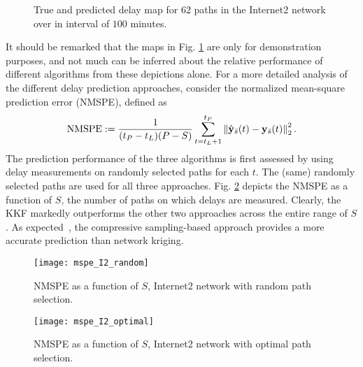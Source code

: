 \documentclass[draftcls,onecolumn,12pt]{IEEEtran}
\newlength \figwidth
\def \ybt {{\b{y}_{\bar{s}}(t)}}
\def \yh {{\hat{\b{y}}_{\bar{s}}}}
\theoremstyle{plain}\newtheorem{thm}{Theorem}
\theoremstyle{definition}
\theoremstyle{remark}
\begin{document}
\begin{figure}
	\centering
     
  \caption{True and predicted delay map for $62$ paths in the Internet2 network over in interval of $100$ minutes.}
  \label{delaymaps}
\end{figure}


{It should be remarked that the maps in Fig. \ref{delaymaps} are only for demonstration purposes, and not much can be inferred about the relative performance of different algorithms from these depictions alone.} For a more detailed analysis of the different delay prediction approaches, consider the normalized mean-square prediction error (NMSPE), defined as
\begin{align}
\text{NMSPE} := \frac{1}{(t_P-t_L)(P-S)}\sum_{t=t_L+1}^{t_P}\left\|\yh(t)-\ybt\right\|_2^2.
\end{align} 
The prediction performance of the three algorithms is first assessed by using delay measurements on randomly selected paths for each $t$. The (same) randomly selected paths are used for all three approaches. 
Fig. \ref{mspeI2random} depicts the NMSPE as a function of $S$, the number of paths on which delays are measured. Clearly, the KKF markedly outperforms the other two approaches across the entire range of $S$. As expected~\cite{coates}, the compressive sampling-based approach provides a more accurate prediction than network kriging. 

\begin{figure}[t]
\centering
\texttt{[image: mspe\_I2\_random]}
\caption{NMSPE as a function of $S$, Internet2 network with random path selection.}
\label{mspeI2random}
\end{figure}



\begin{figure}
\centering
\texttt{[image: mspe\_I2\_optimal]}
\caption{NMSPE as a function of $S$, Internet2 network with optimal path selection.}
\label{mspeI2optimal}
\end{figure}
\end{document}
